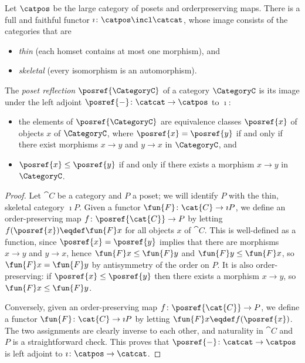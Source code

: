     \begingroup
    \def\thedefinition{\ref{def: poset reflection}}
    \begin{definition}
        Let $\catpos$ be the large category of posets and order\nbd preserving maps.
        There is a full and faithful functor $\imath\colon \catpos \incl \catcat$, whose image consists of the categories that are
        \begin{itemize}
            \item \emph{thin} (each hom\nbd set contains at most one morphism), and
            \item \emph{skeletal} (every isomorphism is an automorphism).
        \end{itemize}

        The \emph{poset reflection} $\posref{\CategoryC}$ of a category $\CategoryC$ is its image under the left adjoint $\posref{-}\colon \catcat \to \catpos$ to $\imath$:
        \begin{itemize}
            \item the elements of $\posref{\CategoryC}$ are equivalence classes $\posref{x}$ of objects $x$ of $\CategoryC$, where $\posref{x} = \posref{y}$ if and only if there exist morphisms $x \to y$ and $y \to x$ in $\CategoryC$, and
            \item $\posref{x} \leq \posref{y}$ if and only if there exists a morphism $x \to y$ in $\CategoryC$.
        \end{itemize}
    \end{definition}
    \addtocounter{definition}{-1}
    \endgroup
    \begin{proof}
    Let $\cat{C}$ be a category and $P$ a poset; we will identify $P$ with the thin, skeletal category $\imath P$.
    Given a functor $\fun{F}\colon \cat{C} \to \imath P$, we define an order-preserving map $f\colon \posref{\cat{C}} \to P$ by letting $f(\posref{x}) \eqdef \fun{F}x$ for all objects $x$ of $\cat{C}$.
    This is well-defined as a function, since $\posref{x} = \posref{y}$ implies that there are morphisms $x \to y$ and $y \to x$, hence $\fun{F}x \leq \fun{F}y$ and $\fun{F}y \leq \fun{F}x$, so $\fun{F}x = \fun{F}y$ by antisymmetry of the order on $P$.
    It is also order-preserving: if $\posref{x} \leq \posref{y}$ then there exists a morphism $x \to y$, so $\fun{F}x \leq \fun{F}y$.

    Conversely, given an order-preserving map $f\colon \posref{\cat{C}} \to P$, we define a functor $\fun{F}\colon \cat{C} \to \imath P$ by letting $\fun{F}x \eqdef f(\posref{x})$.
    The two assignments are clearly inverse to each other, and naturality in $\cat{C}$ and $P$ is a straightforward check.
    This proves that $\posref{-}\colon \catcat \to \catpos$ is left adjoint to $\imath\colon \catpos \to \catcat$.
    \end{proof}

